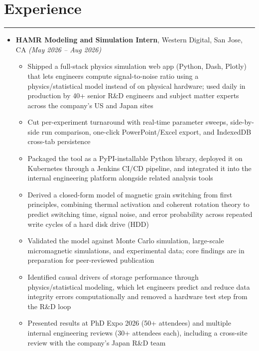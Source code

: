 \documentclass[11pt]{article}
\begin{document}
\section*{Experience}
\hrule
\vspace{-0.3em}
\begin{itemize}[label={}, leftmargin=0pt]
    \item \textbf{HAMR Modeling and Simulation Intern}, Western Digital, San Jose, CA \hfill \textit{(May 2026 -- Aug 2026)}
    \vspace{-0.5em}
    \begin{itemize}
        \item Shipped a full-stack physics simulation web app (Python, Dash, Plotly) that lets engineers compute signal-to-noise ratio using a physics/statistical model instead of on physical hardware; used daily in production by 40+ senior R\&D engineers and subject matter experts across the company's US and Japan sites
        \vspace{-0.5em}
        \item Cut per-experiment turnaround with real-time parameter sweeps, side-by-side run comparison, one-click PowerPoint/Excel export, and IndexedDB cross-tab persistence
        \vspace{-0.5em}
        \item Packaged the tool as a PyPI-installable Python library, deployed it on Kubernetes through a Jenkins CI/CD pipeline, and integrated it into the internal engineering platform alongside related analysis tools
        \vspace{-0.5em}
        \item Derived a closed-form model of magnetic grain switching from first principles, combining thermal activation and coherent rotation theory to predict switching time, signal noise, and error probability across repeated write cycles of a hard disk drive (HDD)
        \vspace{-0.5em}
        \item Validated the model against Monte Carlo simulation, large-scale micromagnetic simulations, and experimental data; core findings are in preparation for peer-reviewed publication
        \vspace{-0.5em}
        \item Identified causal drivers of storage performance through physics/statistical modeling, which let engineers predict and reduce data integrity errors computationally and removed a hardware test step from the R\&D loop
        \vspace{-0.5em}
        \item Presented results at PhD Expo 2026 (50+ attendees) and multiple internal engineering reviews (30+ attendees each), including a cross-site review with the company's Japan R\&D team
    \end{itemize}


\end{itemize}
\end{document}
